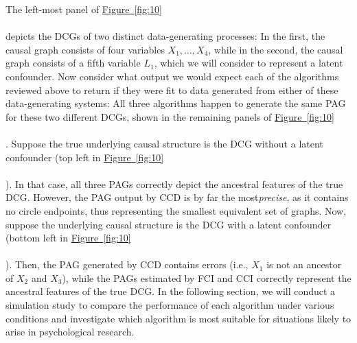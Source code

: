 \documentclass[twoside, 11pt]{article}
\newcommand*{\figref}[2][]{%
  \hyperref[{fig:#2}]{%
    Figure~\ref*{fig:#2}%
    \ifx\\#1\\%
    \else
      #1%
    \fi
  }%
}
\begin{document}
The left-most panel of \figref[]{10} depicts the DCGs of two distinct data-generating processes: In the first, the causal graph consists of four variables $X_1, \dots, X_4$, while in the second, the causal graph consists of a fifth variable $L_1$, which we will consider to represent a latent confounder. Now consider what output we would expect each of the algorithms reviewed above to return if they were fit to data generated from either of these data-generating systems: All three algorithms happen to generate the same PAG for these two different DCGs, shown in the remaining panels of \figref[]{10}. Suppose the true underlying causal structure is the DCG without a latent confounder (top left in \figref[]{10}). In that case, all three PAGs correctly depict the ancestral features of the true DCG. However, the PAG output by CCD is by far the most\textit{precise}, as it contains no circle endpoints, thus representing the smallest equivalent set of graphs. Now, suppose the underlying causal structure is the DCG with a latent confounder (bottom left in \figref[]{10}). Then, the PAG generated by CCD contains errors (i.e., $X_1$ is not an ancestor of $X_2$ and $X_3$), while the PAGs estimated by FCI and CCI correctly represent the ancestral features of the true DCG. In the following section, we will conduct a simulation study to compare the performance of each algorithm under various conditions and investigate which algorithm is most suitable for situations likely to arise in psychological research.



\end{document}
